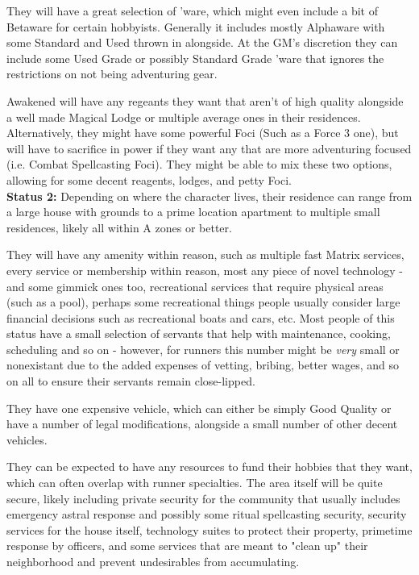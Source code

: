 \begin{multicols*}{2}
	They will have a great selection of 'ware, which might even include a bit of Betaware for certain hobbyists. Generally it includes mostly Alphaware with some Standard and Used thrown in alongside. At the GM's discretion they can include some Used Grade or possibly Standard Grade 'ware that ignores the restrictions on not being adventuring gear.
	
	Awakened will have any regeants they want that aren't of high quality alongside a well made Magical Lodge or multiple average ones in their residences. Alternatively, they might have some powerful Foci (Such as a Force 3 one), but will have to sacrifice in power if they want any that are more adventuring focused (i.e. Combat Spellcasting Foci). They might be able to mix these two options, allowing for some decent reagents, lodges, and petty Foci. \\
	
	\textbf{Status 2:} Depending on where the character lives, their residence can range from a large house with grounds to a prime location apartment to multiple small residences, likely all within A zones or better.
	
	They will have any amenity within reason, such as multiple fast Matrix services, every service or membership within reason, most any piece of novel technology - and some gimmick ones too, recreational services that require physical areas (such as a pool), perhaps some recreational things people usually consider large financial decisions such as recreational boats and cars, etc. Most people of this status have a small selection of servants that help with maintenance, cooking, scheduling and so on - however, for runners this number might be \textit{very} small or nonexistant due to the added expenses of vetting, bribing, better wages, and so on all to ensure their servants remain close-lipped.
	
	They have one expensive vehicle, which can either be simply Good Quality or have a number of legal modifications, alongside a small number of other decent vehicles. 
	
	They can be expected to have any resources to fund their hobbies that they want, which can often overlap with runner specialties. The area itself will be quite secure, likely including private security for the community that usually includes emergency astral response and possibly some ritual spellcasting security, security services for the house itself, technology suites to protect their property, primetime response by officers, and some services that are meant to "clean up" their neighborhood and prevent undesirables from accumulating. 
	

\end{multicols*}
